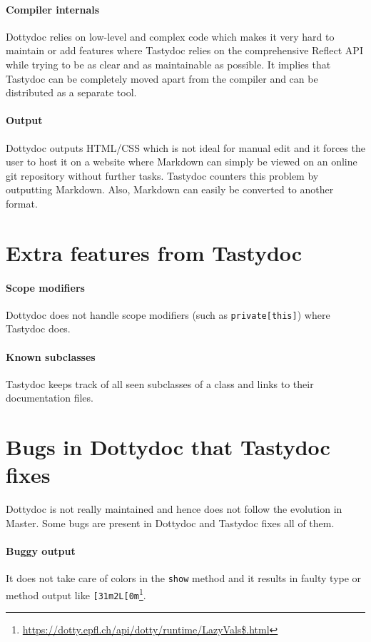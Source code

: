 \documentclass{report}
\begin{document}
\paragraph{Compiler internals}
Dottydoc relies on low-level and complex code which makes it very hard to maintain or add features where Tastydoc relies on the comprehensive Reflect API while trying to be as clear and as maintainable as possible. It implies that Tastydoc can be completely moved apart from the compiler and can be distributed as a separate tool.

\paragraph{Output}
Dottydoc outputs HTML/CSS which is not ideal for manual edit and it forces the user to host it on a website where Markdown can simply be viewed on an online git repository without further tasks. Tastydoc counters this problem by outputting Markdown. Also, Markdown can easily be converted to another format.

\section{Extra features from Tastydoc}
\label{sec:extra}
\paragraph{Scope modifiers}
Dottydoc does not handle scope modifiers (such as \texttt{private[this]}) where Tastydoc does.

\paragraph{Known subclasses}
Tastydoc keeps track of all seen subclasses of a class and links to their documentation files.

\section{Bugs in Dottydoc that Tastydoc fixes}
Dottydoc is not really maintained and hence does not follow the evolution in Master. Some bugs are present in Dottydoc and Tastydoc fixes all of them.

\paragraph{Buggy output}
It does not take care of colors in the \texttt{show} method and it results in faulty type or method output like \texttt{[31m2L[0m}\footnote{\url{https://dotty.epfl.ch/api/dotty/runtime/LazyVals$.html}}.
\end{document}
